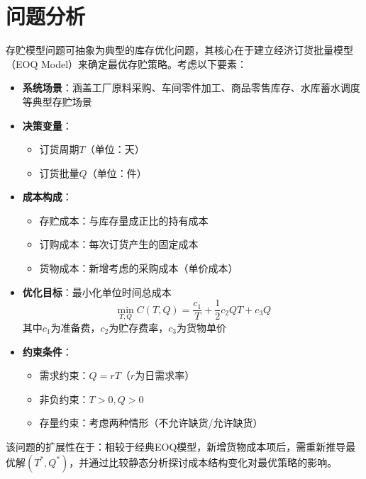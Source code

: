 \section{问题分析}

存贮模型问题可抽象为典型的库存优化问题，其核心在于建立经济订货批量模型（EOQ Model）来确定最优存贮策略。考虑以下要素：

\begin{itemize}
    \item \textbf{系统场景}：涵盖工厂原料采购、车间零件加工、商品零售库存、水库蓄水调度等典型存贮场景
    
    \item \textbf{决策变量}：
        \begin{itemize}
            \item 订货周期$T$（单位：天）
            \item 订货批量$Q$（单位：件）
        \end{itemize}
    
    \item \textbf{成本构成}：
        \begin{itemize}
            \item 存贮成本：与库存量成正比的持有成本
            \item 订购成本：每次订货产生的固定成本
            \item 货物成本：新增考虑的采购成本（单价成本）
        \end{itemize}
    
    \item \textbf{优化目标}：最小化单位时间总成本
        \[
        \min_{T,Q} C(T,Q) = \frac{c_1}{T} + \frac{1}{2}c_2 Q T + c_3 Q
        \]
        其中$c_1$为准备费，$c_2$为贮存费率，$c_3$为货物单价
    
    \item \textbf{约束条件}：
        \begin{itemize}
            \item 需求约束：$Q = rT$（$r$为日需求率）
            \item 非负约束：$T>0, Q>0$
            \item 存量约束：考虑两种情形（不允许缺货/允许缺货）
        \end{itemize}
\end{itemize}

该问题的扩展性在于：相较于经典EOQ模型，新增货物成本项后，需重新推导最优解$(T^*, Q^*)$，并通过比较静态分析探讨成本结构变化对最优策略的影响。
